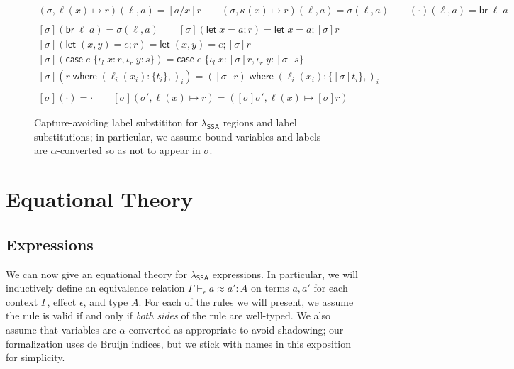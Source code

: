 \documentclass[acmsmall,screen,review]{acmart}
\newcommand{\ms}[1]{\ensuremath{\mathsf{#1}}}
\newcommand{\lto}{:}
\newcommand{\linl}[1]{\iota_l\;{#1}}
\newcommand{\linr}[1]{\iota_r\;{#1}}
\newcommand{\letstmt}[3]{\ensuremath{\ms{let}\;#1 = #2; #3}}
\newcommand{\brb}[2]{\ms{br}\;#1\;#2}
\newcommand{\casestmt}[5]{\ms{case}\;#1\;\{\linl{#2} \lto #3, \linr{#4} \lto #5\}}
\newcommand{\where}[2]{#1\;\ms{where}\;#2}
\newcommand{\wbranch}[3]{#1(#2) \lto \{#3\}}
\newcommand{\teqv}{\approx}
\newcommand{\tmeq}[5]{#1 \vdash_{#2} #3 \teqv #4 : {#5}}
\newcommand{\isotopessa}{\(\lambda_{\ms{SSA}}\)}
\begin{document}
\begin{figure}
  \begin{gather*}
    (\sigma, \ell(x) \mapsto r)(\ell, a) = [a/x]r \qquad
    (\sigma, \kappa(x) \mapsto r)(\ell, a) = \sigma(\ell, a) \qquad
    (\cdot)(\ell, a) = \brb{\ell}{a}
    \\ \\
    [\sigma](\brb{\ell}{a}) = \sigma(\ell, a) \qquad
    [\sigma](\letstmt{x}{a}{r}) = \letstmt{x}{a}{[\sigma]r} \\
    [\sigma](\letstmt{(x, y)}{e}{r}) = \letstmt{(x, y)}{e}{[\sigma]r} \\
    [\sigma](\casestmt{e}{x}{r}{y}{s}) = \casestmt{e}{x}{[\sigma]r}{y}{[\sigma]s} \\
    [\sigma](\where{r}{(\wbranch{\ell_i}{x_i}{t_i},)_i}) =
    \where{([\sigma]r)}{(\wbranch{\ell_i}{x_i}{[\sigma]t_i},)_i} 
    \\ \\
    [\sigma](\cdot) = \cdot \qquad
    [\sigma](\sigma', \ell(x) \mapsto r) 
    = ([\sigma]\sigma', \ell(x) \mapsto [\sigma]r)
  \end{gather*}
  \caption{ 
    Capture-avoiding label substititon for \isotopessa{} regions and label substitutions; in 
    particular, we assume bound variables and labels are $\alpha$-converted  so as not to appear in 
    $\sigma$. 
  } 
  \Description{}
  \label{fig:ssa-label-subst-def}
\end{figure}

\section{Equational Theory}

\label{sec:equations}

\subsection{Expressions}

We can now give an equational theory for \isotopessa{} expressions. In particular, we will
inductively define an equivalence relation
$
\tmeq{\Gamma}{\epsilon}{a}{a'}{A}
$
on terms $a, a'$ for each context $\Gamma$, effect $\epsilon$, and type $A$. For each of the rules
we will present, we assume the rule is valid if and only if \emph{both sides} of the rule are
well-typed. We also assume that variables are $\alpha$-converted as appropriate to avoid shadowing;
our formalization uses de Bruijn indices, but we stick with names in this exposition for simplicity.
\end{document}
